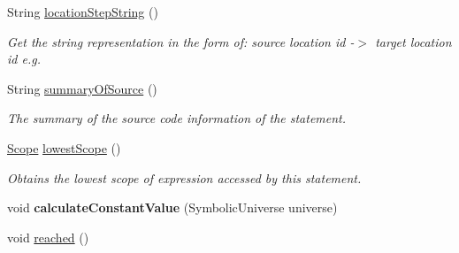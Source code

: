 \begin{DoxyCompactItemize}
\item 
String \hyperlink{interfaceedu_1_1udel_1_1cis_1_1vsl_1_1civl_1_1model_1_1IF_1_1statement_1_1Statement_ae52f55b2c6b8eb5d4282374fbedbdfd8}{location\+Step\+String} ()
\begin{DoxyCompactList}\small\item\em Get the string representation in the form of\+: source location id -\/$>$ target location id e.\+g. \end{DoxyCompactList}\item 
String \hyperlink{interfaceedu_1_1udel_1_1cis_1_1vsl_1_1civl_1_1model_1_1IF_1_1statement_1_1Statement_ae5465d434a76ee46161035029e89b21d}{summary\+Of\+Source} ()
\begin{DoxyCompactList}\small\item\em The summary of the source code information of the statement. \end{DoxyCompactList}\item 
\hyperlink{interfaceedu_1_1udel_1_1cis_1_1vsl_1_1civl_1_1model_1_1IF_1_1Scope}{Scope} \hyperlink{interfaceedu_1_1udel_1_1cis_1_1vsl_1_1civl_1_1model_1_1IF_1_1statement_1_1Statement_ad6826b5b23561576059c85701b7a1319}{lowest\+Scope} ()
\begin{DoxyCompactList}\small\item\em Obtains the lowest scope of expression accessed by this statement. \end{DoxyCompactList}\item 
\hypertarget{interfaceedu_1_1udel_1_1cis_1_1vsl_1_1civl_1_1model_1_1IF_1_1statement_1_1Statement_a623b72ebf696f3b8a173b08ded390493}{}void {\bfseries calculate\+Constant\+Value} (Symbolic\+Universe universe)\label{interfaceedu_1_1udel_1_1cis_1_1vsl_1_1civl_1_1model_1_1IF_1_1statement_1_1Statement_a623b72ebf696f3b8a173b08ded390493}

\item 
\hypertarget{interfaceedu_1_1udel_1_1cis_1_1vsl_1_1civl_1_1model_1_1IF_1_1statement_1_1Statement_a150f04e97c91aecd23dd133621d5dc4d}{}void \hyperlink{interfaceedu_1_1udel_1_1cis_1_1vsl_1_1civl_1_1model_1_1IF_1_1statement_1_1Statement_a150f04e97c91aecd23dd133621d5dc4d}{reached} ()\label{interfaceedu_1_1udel_1_1cis_1_1vsl_1_1civl_1_1model_1_1IF_1_1statement_1_1Statement_a150f04e97c91aecd23dd133621d5dc4d}


\end{DoxyCompactItemize}
